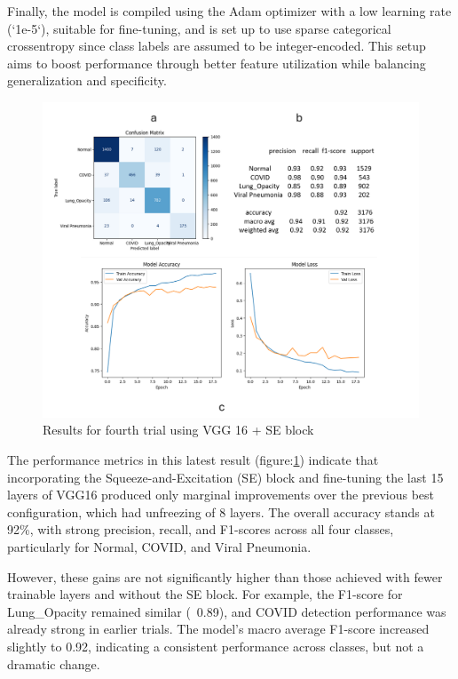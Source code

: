 \documentclass{article}
\begin{document}
Finally, the model is compiled using the Adam optimizer with a low learning rate (`1e-5`), suitable for fine-tuning, and is set up to use sparse categorical crossentropy since class labels are assumed to be integer-encoded. This setup aims to boost performance through better feature utilization while balancing generalization and specificity.

\begin{figure}[h!] %
    \centering
    \includegraphics[width=1.0\linewidth]{vgg16se.png}
    \caption{Results for fourth trial using VGG 16 + SE block}
    \label{fig:vgg16result+se.png}
\end{figure}

The performance metrics in this latest result (figure:\ref{fig:vgg16result+se.png}) indicate that incorporating the Squeeze-and-Excitation (SE) block and fine-tuning the last 15 layers of VGG16 produced only marginal improvements over the previous best configuration, which had unfreezing of 8 layers. The overall accuracy stands at 92\%, with strong precision, recall, and F1-scores across all four classes, particularly for Normal, COVID, and Viral Pneumonia.

However, these gains are not significantly higher than those achieved with fewer trainable layers and without the SE block. For example, the F1-score for Lung\_Opacity remained similar (~0.89), and COVID detection performance was already strong in earlier trials. The model’s macro average F1-score increased slightly to 0.92, indicating a consistent performance across classes, but not a dramatic change.
\end{document}
